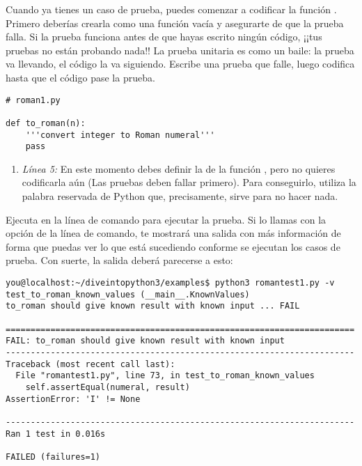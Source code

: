 \begin{enumerate}
\end{enumerate}


Cuando ya tienes un caso de prueba, puedes comenzar a codificar la función . Primero deberías crearla como una función vacía y asegurarte de que la prueba falla. Si la prueba funciona antes de que hayas escrito ningún código, ¡¡tus pruebas no están probando nada!! La prueba unitaria es como un baile: la prueba va llevando, el código la va siguiendo. Escribe una prueba que falle, luego codifica hasta que el código pase la prueba.

\noindent\begin{minipage}{\textwidth}
\begin{lstlisting}[mathescape=True]
# roman1.py

def to_roman(n):
    '''convert integer to Roman numeral'''
    pass
\end{lstlisting}
\end{minipage}

\begin{enumerate}

\item \emph{Línea 5:} En este momento debes definir la  de la función , pero no quieres codificarla aún (Las pruebas deben fallar primero). Para conseguirlo, utiliza la palabra reservada de Python  que, precisamente, sirve para no hacer nada.

\end{enumerate}

Ejecuta  en la línea de comando para ejecutar la prueba. Si lo llamas con la opción  de la línea de comando, te mostrará una salida con más información de forma que puedas ver lo que está sucediendo conforme se ejecutan los casos de prueba. Con suerte, la salida deberá parecerse a esto:

\noindent\begin{minipage}{\textwidth}
\begin{lstlisting}[mathescape=False]
you@localhost:~/diveintopython3/examples$ python3 romantest1.py -v
test_to_roman_known_values (__main__.KnownValues)
to_roman should give known result with known input ... FAIL

======================================================================
FAIL: to_roman should give known result with known input
----------------------------------------------------------------------
Traceback (most recent call last):
  File "romantest1.py", line 73, in test_to_roman_known_values
    self.assertEqual(numeral, result)
AssertionError: 'I' != None

----------------------------------------------------------------------
Ran 1 test in 0.016s

FAILED (failures=1)
\end{lstlisting}
\end{minipage}


